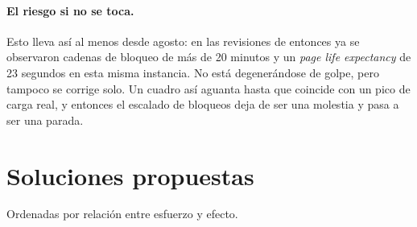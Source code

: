 \documentclass[11pt,a4paper]{article}
\begin{document}
\paragraph{El riesgo si no se toca.} Esto lleva así al menos desde agosto:
en las revisiones de entonces ya se observaron cadenas de bloqueo de más de
20 minutos y un \emph{page life expectancy} de 23 segundos en esta misma
instancia. No está degenerándose de golpe, pero tampoco se corrige solo. Un
cuadro así aguanta hasta que coincide con un pico de carga real, y entonces
el escalado de bloqueos deja de ser una molestia y pasa a ser una parada.

\section{Soluciones propuestas}

Ordenadas por relación entre esfuerzo y efecto.
\end{document}
